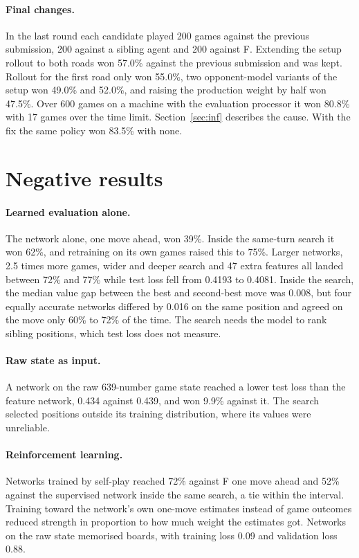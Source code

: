 \documentclass[11pt,a4paper]{article}
\begin{document}
\paragraph{Final changes.} In the last round each candidate played 200 games against the previous submission,
200 against a sibling agent and 200 against F. Extending the setup rollout to both roads won 57.0\% against the
previous submission and was kept. Rollout for the first road only won 55.0\%, two opponent-model variants of the
setup won 49.0\% and 52.0\%, and raising the production weight by half won 47.5\%. Over 600
games on a machine with the evaluation processor it won 80.8\% with 17 games over the time limit. Section~\ref{sec:inf}
describes the cause. With the fix the same policy won 83.5\% with none.


\section{Negative results}\label{sec:neg}
\paragraph{Learned evaluation alone.} The network alone, one move ahead, won 39\%. Inside the same-turn search it won
62\%, and retraining on its own games raised this to 75\%. Larger networks, 2.5 times more games, wider and deeper
search and 47 extra features all landed between 72\% and 77\% while test loss fell from 0.4193 to 0.4081. Inside the
search, the median value gap between the best and second-best move was 0.008, but four equally accurate networks
differed by 0.016 on the same position and agreed on the move only 60\% to 72\% of the time. The search needs the
model to rank sibling positions, which test loss does not measure.

\paragraph{Raw state as input.} A network on the raw 639-number game state reached a lower test loss than the feature
network, 0.434 against 0.439, and won 9.9\% against it. The search selected positions outside its training
distribution, where its values were unreliable.

\paragraph{Reinforcement learning.} Networks trained by self-play reached 72\% against F one move ahead and 52\%
against the supervised network inside the same search, a tie within the interval. Training toward the network's own
one-move estimates instead of game outcomes reduced strength in proportion to how much weight the estimates got.
Networks on the raw state memorised boards, with training loss 0.09 and validation loss 0.88.
\end{document}
